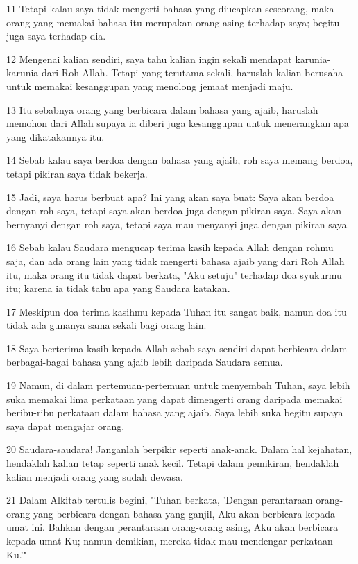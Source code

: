 \par 11 Tetapi kalau saya tidak mengerti bahasa yang diucapkan seseorang, maka orang yang memakai bahasa itu merupakan orang asing terhadap saya; begitu juga saya terhadap dia.
\par 12 Mengenai kalian sendiri, saya tahu kalian ingin sekali mendapat karunia-karunia dari Roh Allah. Tetapi yang terutama sekali, haruslah kalian berusaha untuk memakai kesanggupan yang menolong jemaat menjadi maju.
\par 13 Itu sebabnya orang yang berbicara dalam bahasa yang ajaib, haruslah memohon dari Allah supaya ia diberi juga kesanggupan untuk menerangkan apa yang dikatakannya itu.
\par 14 Sebab kalau saya berdoa dengan bahasa yang ajaib, roh saya memang berdoa, tetapi pikiran saya tidak bekerja.
\par 15 Jadi, saya harus berbuat apa? Ini yang akan saya buat: Saya akan berdoa dengan roh saya, tetapi saya akan berdoa juga dengan pikiran saya. Saya akan bernyanyi dengan roh saya, tetapi saya mau menyanyi juga dengan pikiran saya.
\par 16 Sebab kalau Saudara mengucap terima kasih kepada Allah dengan rohmu saja, dan ada orang lain yang tidak mengerti bahasa ajaib yang dari Roh Allah itu, maka orang itu tidak dapat berkata, "Aku setuju" terhadap doa syukurmu itu; karena ia tidak tahu apa yang Saudara katakan.
\par 17 Meskipun doa terima kasihmu kepada Tuhan itu sangat baik, namun doa itu tidak ada gunanya sama sekali bagi orang lain.
\par 18 Saya berterima kasih kepada Allah sebab saya sendiri dapat berbicara dalam berbagai-bagai bahasa yang ajaib lebih daripada Saudara semua.
\par 19 Namun, di dalam pertemuan-pertemuan untuk menyembah Tuhan, saya lebih suka memakai lima perkataan yang dapat dimengerti orang daripada memakai beribu-ribu perkataan dalam bahasa yang ajaib. Saya lebih suka begitu supaya saya dapat mengajar orang.
\par 20 Saudara-saudara! Janganlah berpikir seperti anak-anak. Dalam hal kejahatan, hendaklah kalian tetap seperti anak kecil. Tetapi dalam pemikiran, hendaklah kalian menjadi orang yang sudah dewasa.
\par 21 Dalam Alkitab tertulis begini, "Tuhan berkata, 'Dengan perantaraan orang-orang yang berbicara dengan bahasa yang ganjil, Aku akan berbicara kepada umat ini. Bahkan dengan perantaraan orang-orang asing, Aku akan berbicara kepada umat-Ku; namun demikian, mereka tidak mau mendengar perkataan-Ku.'"
